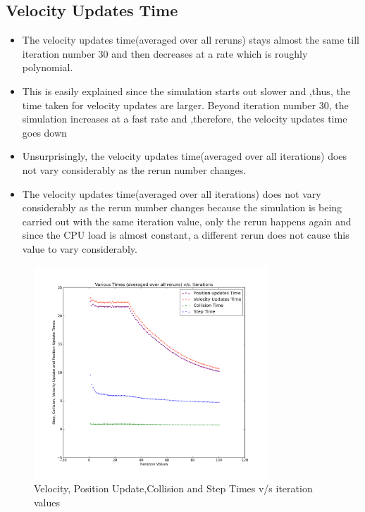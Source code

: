 \documentclass[11pt]{article}
\begin{document}
	
\subsection{Velocity Updates Time}
	\begin{itemize}
		\item The velocity updates time(averaged over all reruns) stays almost the same till iteration number 30 and then decreases at a rate which is roughly polynomial.
		\item This is easily explained since the simulation starts out slower and ,thus, the time taken for velocity updates are larger. Beyond iteration number 30, the simulation increases at a fast rate and ,therefore, the velocity updates time goes down
		\item Unsurprisingly, the velocity updates time(averaged over all iterations) does not vary considerably as the rerun number changes.
		\item The velocity updates time(averaged over all iterations) does not vary considerably as the rerun number changes because the simulation is being carried out with the same iteration value, only the rerun happens again and since the CPU load is almost constant, a different rerun does not cause this value to vary considerably.
	\end{itemize}
\begin{figure}[h!]
\caption{Velocity, Position Update,Collision and Step Times v/s iteration values}
\centering
\includegraphics[height=8cm]{images/g19_proj_plot02}
\end{figure}
\end{document}
